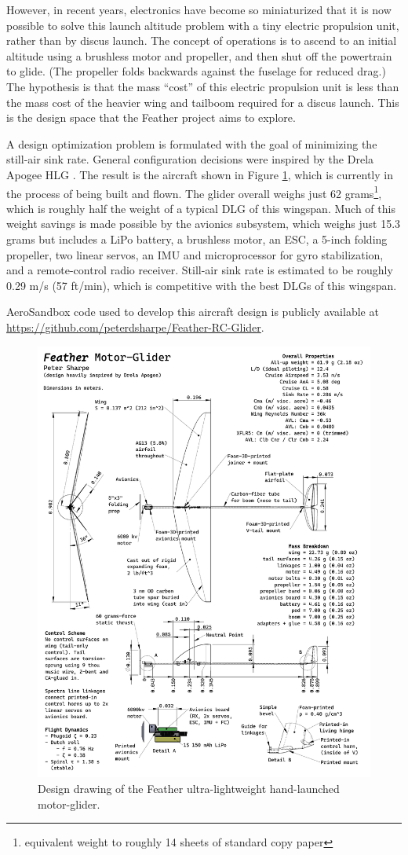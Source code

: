 However, in recent years, electronics have become so miniaturized that it is now possible to solve this launch altitude problem with a tiny electric propulsion unit, rather than by discus launch. The concept of operations is to ascend to an initial altitude using a brushless motor and propeller, and then shut off the powertrain to glide. (The propeller folds backwards against the fuselage for reduced drag.) The hypothesis is that the mass ``cost'' of this electric propulsion unit is less than the mass cost of the heavier wing and tailboom required for a discus launch. This is the design space that the Feather project aims to explore.

A design optimization problem is formulated with the goal of minimizing the still-air sink rate. General configuration decisions were inspired by the Drela Apogee HLG \cite{drela_apogee_hlg}. The result is the aircraft shown in Figure \ref{fig:feather_design}, which is currently in the process of being built and flown. The glider overall weighs just 62 grams\footnote{equivalent weight to roughly 14 sheets of standard copy paper}, which is roughly half the weight of a typical DLG of this wingspan. Much of this weight savings is made possible by the avionics subsystem, which weighs just 15.3 grams but includes a LiPo battery, a brushless motor, an ESC, a 5-inch folding propeller, two linear servos, an IMU and microprocessor for gyro stabilization, and a remote-control radio receiver. Still-air sink rate is estimated to be roughly 0.29 m/s (57 ft/min), which is competitive with the best DLGs of this wingspan.

AeroSandbox code used to develop this aircraft design is publicly available at \url{https://github.com/peterdsharpe/Feather-RC-Glider}.

\newpage
\begin{figure}[H]
    \centering
    \includegraphics[page=1, width=\textwidth]{../figures/feather.pdf}
    \caption{Design drawing of the Feather ultra-lightweight hand-launched motor-glider.}
    \label{fig:feather_design}
\end{figure}
